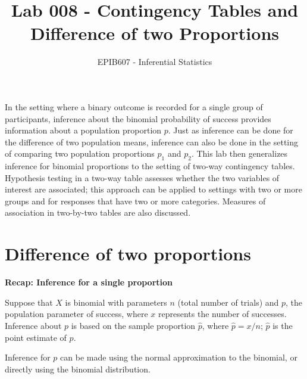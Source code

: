 \documentclass[letterpaper,12pt,twoside,]{pinp}
\title{Lab 008 - Contingency Tables and Difference of two Proportions}
\author[a]{EPIB607 - Inferential Statistics}
\affil[a]{Fall 2020, McGill University}
\begin{document}
\verticaladjustment{-2pt}

\maketitle
\thispagestyle{firststyle}



\tableofcontents

In the setting where a binary outcome is recorded for a single group of
participants, inference about the binomial probability of success
provides information about a population proportion \(p\). Just as
inference can be done for the difference of two population means,
inference can also be done in the setting of comparing two population
proportions \(p_1\) and \(p_2\). This lab then generalizes inference for
binomial proportions to the setting of two-way contingency tables.
Hypothesis testing in a two-way table assesses whether the two variables
of interest are associated; this approach can be applied to settings
with two or more groups and for responses that have two or more
categories. Measures of association in two-by-two tables are also
discussed.

\hypertarget{difference-of-two-proportions}{%
\section{Difference of two
proportions}\label{difference-of-two-proportions}}

\textbf{Recap: Inference for a single proportion}

Suppose that \(X\) is binomial with parameters \(n\) (total number of
trials) and \(p\), the population parameter of success, where \(x\)
represents the number of successes. Inference about \(p\) is based on
the sample proportion \(\hat{p}\), where \(\hat{p} = x/n\); \(\hat{p}\)
is the point estimate of \(p\).

Inference for \(p\) can be made using the normal approximation to the
binomial, or directly using the binomial distribution.
\end{document}
